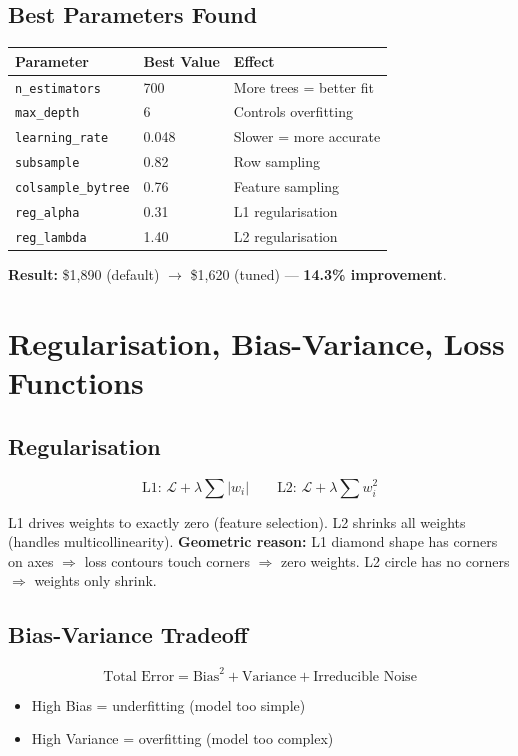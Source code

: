 \documentclass[12pt,a4paper]{article}
\begin{document}
\subsection{Best Parameters Found}
\begin{center}
\begin{tabular}{lll}\toprule
  Parameter & Best Value & Effect\\\midrule
  \texttt{n\_estimators} & 700 & More trees = better fit\\
  \texttt{max\_depth} & 6 & Controls overfitting\\
  \texttt{learning\_rate} & 0.048 & Slower = more accurate\\
  \texttt{subsample} & 0.82 & Row sampling\\
  \texttt{colsample\_bytree} & 0.76 & Feature sampling\\
  \texttt{reg\_alpha} & 0.31 & L1 regularisation\\
  \texttt{reg\_lambda} & 1.40 & L2 regularisation\\\bottomrule
\end{tabular}
\end{center}
\textbf{Result:} \$1,890 (default) $\rightarrow$ \$1,620 (tuned) — \textbf{14.3\% improvement}.

\section{Regularisation, Bias-Variance, Loss Functions}

\subsection{Regularisation}
\begin{formulabox}
\[\text{L1: }\mathcal{L}+\lambda\sum|w_i|\qquad\text{L2: }\mathcal{L}+\lambda\sum w_i^2\]
\end{formulabox}
L1 drives weights to exactly zero (feature selection). L2 shrinks all weights (handles multicollinearity).
\textbf{Geometric reason:} L1 diamond shape has corners on axes $\Rightarrow$ loss contours touch corners $\Rightarrow$ zero weights. L2 circle has no corners $\Rightarrow$ weights only shrink.

\subsection{Bias-Variance Tradeoff}
\[\text{Total Error}=\text{Bias}^2+\text{Variance}+\text{Irreducible Noise}\]
\begin{itemize}
  \item High Bias = underfitting (model too simple)
  \item High Variance = overfitting (model too complex)
\end{itemize}
\end{document}
